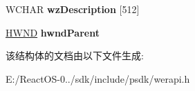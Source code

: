 \begin{DoxyCompactItemize}
\item 
\mbox{\label{struct___w_e_r___r_e_p_o_r_t___i_n_f_o_r_m_a_t_i_o_n_a9f9b6665e147e2c9f8ebb723667396f1}} 
W\+C\+H\+AR {\bfseries wz\+Description} \mbox{[}512\mbox{]}
\item 
\mbox{\label{struct___w_e_r___r_e_p_o_r_t___i_n_f_o_r_m_a_t_i_o_n_ad55835455ce1da3ef54dc1a6c4a69723}} 
\hyperlink{interfacevoid}{H\+W\+ND} {\bfseries hwnd\+Parent}
\end{DoxyCompactItemize}


该结构体的文档由以下文件生成\+:\begin{DoxyCompactItemize}
\item 
E\+:/\+React\+O\+S-\/0../sdk/include/psdk/werapi.\+h\end{DoxyCompactItemize}

